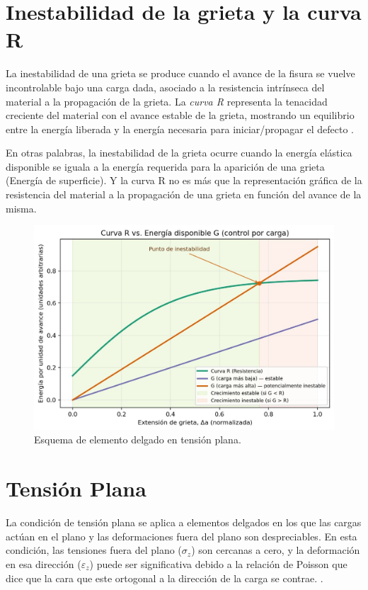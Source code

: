 \documentclass[12pt,letterpaper]{article}
\begin{document}


\section{Inestabilidad de la grieta y la curva R}

La inestabilidad de una grieta se produce cuando el avance de la fisura se vuelve incontrolable bajo una carga dada, asociado a la resistencia intrínseca del material a la propagación de la grieta. La \textit{curva R} representa la tenacidad creciente del material con el avance estable de la grieta, mostrando un equilibrio entre la energía liberada y la energía necesaria para iniciar/propagar el defecto \cite{Broek1982, Cameron2022, Jaramillo2008, AllisonBeese2022, Ponson2022}.

En otras palabras, la inestabilidad de la grieta ocurre cuando la energía elástica disponible se iguala a la energía requerida para la aparición de una grieta (Energía de superficie).
Y la curva R no es más que la representación gráfica de la resistencia del material a la propagación de una grieta en función del avance de la misma.
\vspace{1em}
\begin{figure}[H]
    \centering
    \includegraphics[width=0.8\linewidth]{aa.jpeg} %
    \caption{Esquema de elemento delgado en tensión plana.}
    \label{fig:Curva R}
\end{figure}

\section{Tensión Plana}

La condición de tensión plana se aplica a elementos delgados en los que las cargas actúan en el plano y las deformaciones fuera del plano son despreciables.
En esta condición, las tensiones fuera del plano ($\sigma_z$) son cercanas a cero, y la deformación en esa dirección ($\varepsilon_z$) puede ser significativa debido a la relación de Poisson que dice que la cara que este ortogonal a la dirección de la carga se contrae. \cite{Cameron2022, Ponson2022, Broek1982, Jaramillo2008}.
\vspace{1em}
\end{document}
